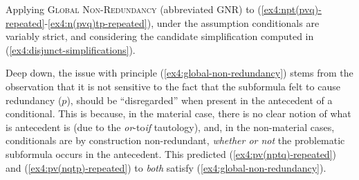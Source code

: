 \begin{exe}
	\ex\label{ex4:gnr-vstrict} Applying \textsc{Global Non-Redundancy} (abbreviated GNR) to (\ref{ex4:npt(pvq)-repeated}-\ref{ex4:n(pvq)tp-repeated}), under the assumption conditionals are variably strict, and considering the candidate simplification computed in (\ref{ex4:disjunct-simplifications}). 
	\begin{xlist}
		\end{xlist}
\end{exe}


Deep down, the issue with principle (\ref{ex4:global-non-redundancy}) stems from the observation that it is not sensitive to the fact that the subformula felt to cause redundancy ($p$), should be ``disregarded'' when present in the antecedent of a conditional. This is because, in the material case, there is no clear notion of what is antecedent is (due to the \textit{or}-to\textit{if} tautology), and, in the non-material cases, conditionals are by construction non-redundant, \textit{whether or not} the problematic subformula occurs in the antecedent. This predicted (\ref{ex4:pv(nptq)-repeated}) and (\ref{ex4:pv(nqtp)-repeated}) to \textit{both} satisfy (\ref{ex4:global-non-redundancy}).


